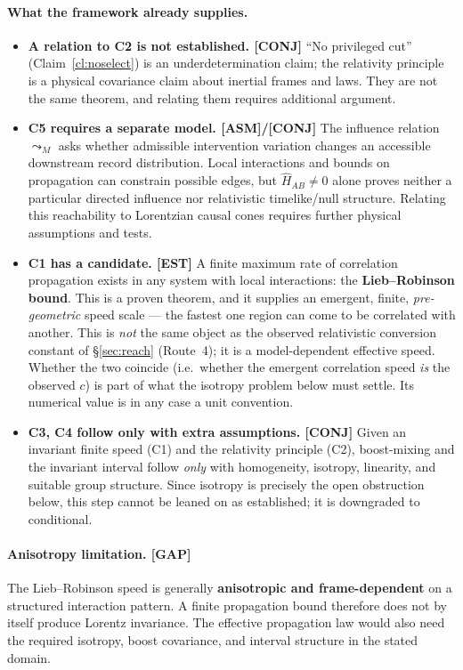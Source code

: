 \documentclass[11pt]{article}
\newcommand{\est}{\textcolor{teal!70!black}{\textsf{\small[EST]}}}
\newcommand{\fields}{\textcolor{violet}{\textsf{\small[FIELDS]}}}
\newcommand{\asm}{\textcolor{blue!70!black}{\textsf{\small[ASM]}}}
\newcommand{\conj}{\textcolor{orange!80!black}{\textsf{\small[CONJ]}}}
\newcommand{\post}{\textcolor{purple!70!black}{\textsf{\small[POST]}}}
\newcommand{\gap}{\textcolor{red!75!black}{\textsf{\small[GAP]}}}
\def\est{[EST]}\def\fields{[FIELDS]}\def\asm{[ASM]}%
\def\conj{[CONJ]}\def\post{[POST]}\def\gap{[GAP]}%
\theoremstyle{definition}
\theoremstyle{remark}
\begin{document}
\paragraph{What the framework already supplies.}
\begin{itemize}[leftmargin=1.4em, itemsep=2pt, topsep=2pt]
  \item \textbf{A relation to C2 is not established. \conj} ``No privileged cut'' (Claim~\ref{cl:noselect}) is an underdetermination claim; the relativity principle is a physical covariance claim about inertial frames and laws. They are not the same theorem, and relating them requires additional argument.
  \item \textbf{C5 requires a separate model. \asm/\conj} The influence relation $\leadsto_M$ asks whether admissible intervention variation changes an accessible downstream record distribution. Local interactions and bounds on propagation can constrain possible edges, but $\hat{H}_{AB}\neq 0$ alone proves neither a particular directed influence nor relativistic timelike/null structure. Relating this reachability to Lorentzian causal cones requires further physical assumptions and tests.
  \item \textbf{C1 has a candidate. \est} A finite maximum rate of correlation propagation exists in any system with local interactions: the \textbf{Lieb--Robinson bound}. This is a proven theorem, and it supplies an emergent, finite, \emph{pre-geometric} speed scale --- the fastest one region can come to be correlated with another. This is \emph{not} the same object as the observed relativistic conversion constant of \S\ref{sec:reach} (Route~4); it is a model-dependent effective speed. Whether the two coincide (i.e.\ whether the emergent correlation speed \emph{is} the observed $c$) is part of what the isotropy problem below must settle. Its numerical value is in any case a unit convention.
  \item \textbf{C3, C4 follow only with extra assumptions. \conj} Given an invariant finite speed (C1) and the relativity principle (C2), boost-mixing and the invariant interval follow \emph{only} with homogeneity, isotropy, linearity, and suitable group structure. Since isotropy is precisely the open obstruction below, this step cannot be leaned on as established; it is downgraded to conditional.
\end{itemize}

\paragraph{Anisotropy limitation. \gap}
The Lieb--Robinson speed is generally \textbf{anisotropic and frame-dependent} on a structured interaction pattern. A finite propagation bound therefore does not by itself produce Lorentz invariance. The effective propagation law would also need the required isotropy, boost covariance, and interval structure in the stated domain.
\end{document}
